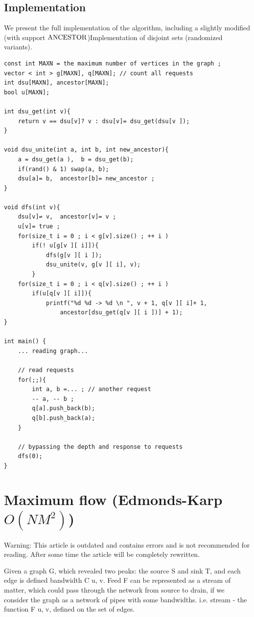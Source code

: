 \subsection{ Implementation }

We present the full implementation of the algorithm, including a slightly modified (with support $\rm ANCESTOR$)Implementation of disjoint sets (randomized variants).

\begin{verbatim}
const int MAXN = the maximum number of vertices in the graph ;
vector < int > g[MAXN], q[MAXN]; // count all requests
int dsu[MAXN], ancestor[MAXN];
bool u[MAXN];
 
int dsu_get(int v){
    return v == dsu[v]? v : dsu[v]= dsu_get(dsu[v ]);
}
 
void dsu_unite(int a, int b, int new_ancestor){
    a = dsu_get(a ),  b = dsu_get(b);
    if(rand() & 1) swap(a, b);
    dsu[a]= b,  ancestor[b]= new_ancestor ;
}
 
void dfs(int v){
    dsu[v]= v,  ancestor[v]= v ;
    u[v]= true ;
    for(size_t i = 0 ; i < g[v].size() ; ++ i )
        if(! u[g[v ][ i]]){
            dfs(g[v ][ i ]);
            dsu_unite(v, g[v ][ i], v);
        }
    for(size_t i = 0 ; i < q[v].size() ; ++ i )
        if(u[q[v ][ i]]){
            printf("%d %d -> %d \n ", v + 1, q[v ][ i]+ 1,
                ancestor[dsu_get(q[v ][ i ])] + 1);
}
 
int main() {
    ... reading graph...
 
    // read requests
    for(;;){
        int a, b =... ; // another request
        -- a, -- b ;
        q[a].push_back(b);
        q[b].push_back(a);
    }
 
    // bypassing the depth and response to requests
    dfs(0);
} 
\end{verbatim}
\section{ Maximum flow (Edmonds-Karp $O(NM^2)$) }
Warning: This article is outdated and contains errors and is not recommended for reading. After some time the article will be completely rewritten.

Given a graph G, which revealed two peaks: the source S and sink T, and each edge is defined bandwidth C u, v. Feed F can be represented as a stream of matter, which could pass through the network from source to drain, if we consider the graph as a network of pipes with some bandwidths. i.e. stream - the function F u, v, defined on the set of edges.

